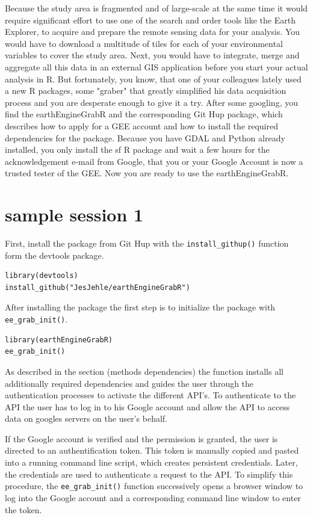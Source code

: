 Because the study area is fragmented and of large-scale at the same time it would require significant effort to use one of the search and order tools like the Earth Explorer, to acquire and prepare the remote sensing data for your analysis. You would have to download a multitude of tiles for each of your environmental variables to cover the study area. Next, you would have to integrate, merge and aggregate all this data in an external GIS application before you start your actual analysis in R. But fortunately, you know, that one of your colleagues lately used a new R packages, some "graber" that greatly simplified his data acquisition process and you are desperate enough to give it a try. After some googling, you find the earthEngineGrabR and the corresponding Git Hup package, which describes how to apply for a GEE account and how to install the required dependencies for the package. Because you have GDAL and Python already installed, you only install the sf R package and wait a few hours for the acknowledgement e-mail from Google, that you or your Google Account is now a trusted tester of the GEE. Now you are ready to use the earthEngineGrabR.

\section{sample session 1}

First, install the package from Git Hup with the \texttt{install\_githup()} function form the devtools package.

\begin{lstlisting}
library(devtools)
install_github("JesJehle/earthEngineGrabR")
\end{lstlisting}

After installing the package the first step is to initialize the package with \texttt{ee\_grab\_init()}. 

\begin{lstlisting}
library(earthEngineGrabR)
ee_grab_init()
\end{lstlisting}

As described in the section (methods dependencies) the function installs all additionally required dependencies and guides the user through the authentication processes to activate the different API's. To authenticate to the API the user has to log in to his Google account and allow the API to access data on googles servers on the user's behalf. 


If the Google account is verified and the permission is granted, the user is directed to an authentification token. This token is manually copied and pasted into a running command line script, which creates persistent credentials. Later, the credentials are used to authenticate a request to the API. To simplify this procedure, the \texttt{ee\_grab\_init()} function successively opens a browser window to log into the Google account and a corresponding command line window to enter the token. 


